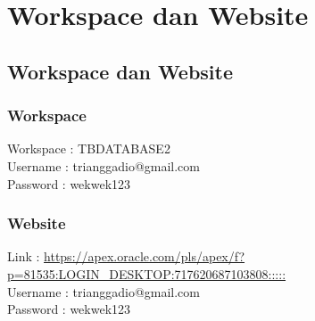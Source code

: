\chapter{Workspace dan Website}

\section{Workspace dan Website}

\subsection{Workspace}
Workspace	: TBDATABASE2\\
Username	: trianggadio@gmail.com\\
Password	: wekwek123

\subsection{Website}
Link 		: \url{https://apex.oracle.com/pls/apex/f?p=81535:LOGIN_DESKTOP:717620687103808:::::}\\
Username	: trianggadio@gmail.com\\
Password	: wekwek123